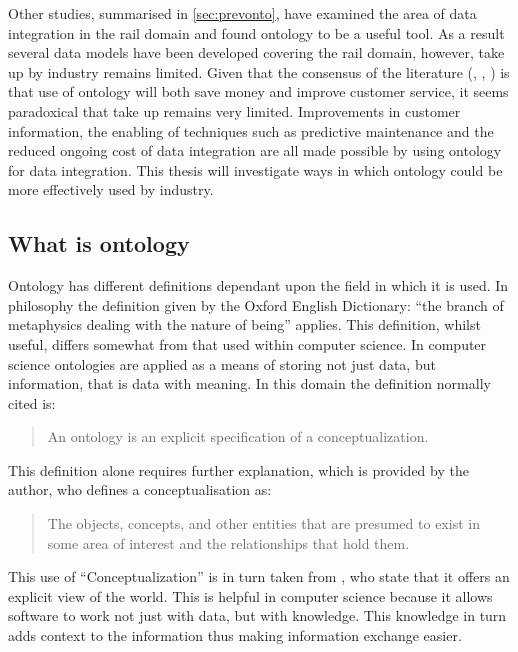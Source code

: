 Other studies, summarised in \autoref{sec:prevonto}, have examined the area of data integration in the rail domain and found ontology to be a useful tool. As a result several data models have been developed covering the rail domain, however, take up by industry remains limited. Given that the consensus of the literature (\citep{Kopf2010}, \citep{Gogos2016}, \citep{Verstichel2015} ) is that use of ontology will both save money and improve customer service, it seems paradoxical that take up remains very limited.  Improvements in customer information, the enabling of techniques such as predictive maintenance and the reduced ongoing cost of data integration are all made possible by using ontology for data integration. This thesis will investigate ways in which ontology could be more effectively used by industry.

\subsection{What is ontology}

Ontology has different definitions dependant upon the field in which it is used. In philosophy the definition given by the Oxford English Dictionary: \enquote{the branch of metaphysics dealing with the nature of being} applies. This definition, whilst useful, differs somewhat from that used within computer science. In computer science ontologies are applied as a means of storing not just data, but information, that is data with meaning. In this domain the definition normally cited is:

\begin{quote}
An ontology is an explicit specification of a conceptualization. 
\end{quote}
\citet{gruber1993translation} 

 This definition alone requires further explanation, which is provided by the author, who defines a conceptualisation as: 
\begin{quote}
	The objects, concepts, and other entities that are presumed to exist in some area of interest and the relationships that hold them.
\end{quote}

 This use of ``Conceptualization'' is in turn taken from \citet{Genesereth1987}, who state that it offers an explicit view of the world. This is helpful in computer science because it allows software to work not just with data, but with knowledge. This knowledge in turn adds context to the information thus making information exchange easier.


